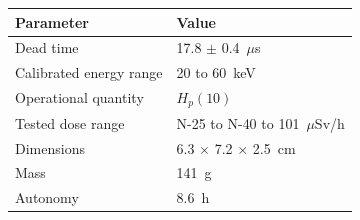 \begin{table}[H]
  \centering
  \small
  \renewcommand{\arraystretch}{1.25}
  \setlength{\tabcolsep}{3mm}
  \begin{tabularx}{0.65\textwidth}{|P|V|}
    \hline
    \textbf{Parameter} & \textbf{Value} \\
    \hline
    Dead time & 17.8 $\pm$ 0.4~$\mu$s \\
    \hline
    Calibrated energy range & 20 to 60~keV \\
    \hline
    Operational quantity & $H_p(10)$ \\
    \hline
    Tested dose range & N-25 to N-40  to 101~$\mu$Sv/h \\
    \hline
    Dimensions & 6.3 $\times$ 7.2 $\times$ 2.5~cm \\
    \hline
    Mass & 141~g \\
    \hline
    Autonomy & 8.6~h \\
    \hline
  \end{tabularx}
\end{table}